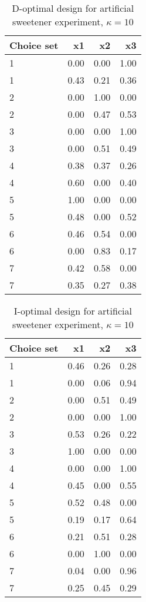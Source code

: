 \begin{table}[ht]
\centering
\begin{tabular}{lrrr}
  \hline
Choice set & x1 & x2 & x3 \\ 
  \hline
1 & 0.00 & 0.00 & 1.00 \\ 
  1 & 0.43 & 0.21 & 0.36 \\ 
  2 & 0.00 & 1.00 & 0.00 \\ 
  2 & 0.00 & 0.47 & 0.53 \\ 
  3 & 0.00 & 0.00 & 1.00 \\ 
  3 & 0.00 & 0.51 & 0.49 \\ 
  4 & 0.38 & 0.37 & 0.26 \\ 
  4 & 0.60 & 0.00 & 0.40 \\ 
  5 & 1.00 & 0.00 & 0.00 \\ 
  5 & 0.48 & 0.00 & 0.52 \\ 
  6 & 0.46 & 0.54 & 0.00 \\ 
  6 & 0.00 & 0.83 & 0.17 \\ 
  7 & 0.42 & 0.58 & 0.00 \\ 
  7 & 0.35 & 0.27 & 0.38 \\ 
   \hline
\end{tabular}
\caption{D-optimal design for artificial sweetener experiment, $\kappa = 10$} 
\label{tab:cornell_exp_d_optimal_des_kappa_10}
\end{table}
\begin{table}[ht]
\centering
\begin{tabular}{lrrr}
  \hline
Choice set & x1 & x2 & x3 \\ 
  \hline
1 & 0.46 & 0.26 & 0.28 \\ 
  1 & 0.00 & 0.06 & 0.94 \\ 
  2 & 0.00 & 0.51 & 0.49 \\ 
  2 & 0.00 & 0.00 & 1.00 \\ 
  3 & 0.53 & 0.26 & 0.22 \\ 
  3 & 1.00 & 0.00 & 0.00 \\ 
  4 & 0.00 & 0.00 & 1.00 \\ 
  4 & 0.45 & 0.00 & 0.55 \\ 
  5 & 0.52 & 0.48 & 0.00 \\ 
  5 & 0.19 & 0.17 & 0.64 \\ 
  6 & 0.21 & 0.51 & 0.28 \\ 
  6 & 0.00 & 1.00 & 0.00 \\ 
  7 & 0.04 & 0.00 & 0.96 \\ 
  7 & 0.25 & 0.45 & 0.29 \\ 
   \hline
\end{tabular}
\caption{I-optimal design for artificial sweetener experiment, $\kappa = 10$} 
\label{tab:cornell_exp_i_optimal_des_kappa_10}
\end{table}
